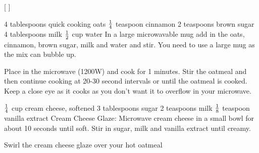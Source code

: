 
[
]

\begin{step}
4 tablespoons quick cooking oats
$\frac{1}{4}$ teaspoon cinnamon
2 teaspoons brown sugar
4 tablespoons milk
$\frac{1}{2}$ cup water
\method
In a large microwavable mug add in the oats, cinnamon, brown sugar, milk and water and stir. You need to use a large mug as the mix can bubble up.

Place in the microwave (1200W) and cook for 1 minutes. Stir the oatmeal and then continue cooking at 20-30 second intervals or until the oatmeal is cooked. Keep a close eye as it cooks as you don’t want it to overflow in your microwave.

\end{step}

\begin{step}
$\frac{1}{4}$ cup cream cheese, softened
3 tablespoons sugar
2 teaspoons milk
$\frac{1}{8}$ teaspoon vanilla extract
\method
Cream Cheese Glaze: Microwave cream cheese in a small bowl for about 10 seconds until soft. Stir in sugar, milk and vanilla extract until creamy.

Swirl the cream cheese glaze over your hot oatmeal
\end{step}